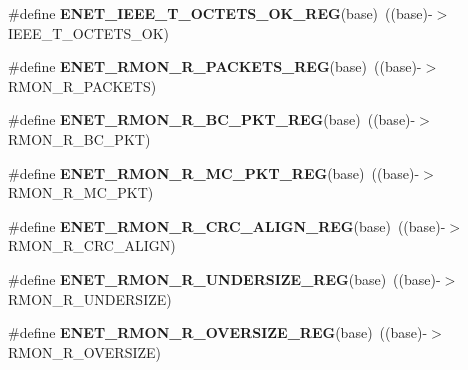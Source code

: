 \begin{DoxyCompactItemize}
\item 
\#define {\bfseries E\+N\+E\+T\+\_\+\+I\+E\+E\+E\+\_\+\+T\+\_\+\+O\+C\+T\+E\+T\+S\+\_\+\+O\+K\+\_\+\+R\+EG}(base)~((base)-\/$>$I\+E\+E\+E\+\_\+\+T\+\_\+\+O\+C\+T\+E\+T\+S\+\_\+\+OK)\hypertarget{group__ENET__Register__Accessor__Macros_gac9dce54cc0acf5325e797a79010ed817}{}\label{group__ENET__Register__Accessor__Macros_gac9dce54cc0acf5325e797a79010ed817}

\item 
\#define {\bfseries E\+N\+E\+T\+\_\+\+R\+M\+O\+N\+\_\+\+R\+\_\+\+P\+A\+C\+K\+E\+T\+S\+\_\+\+R\+EG}(base)~((base)-\/$>$R\+M\+O\+N\+\_\+\+R\+\_\+\+P\+A\+C\+K\+E\+TS)\hypertarget{group__ENET__Register__Accessor__Macros_gafb7aa4f09bcc45af7b97bec98b21447a}{}\label{group__ENET__Register__Accessor__Macros_gafb7aa4f09bcc45af7b97bec98b21447a}

\item 
\#define {\bfseries E\+N\+E\+T\+\_\+\+R\+M\+O\+N\+\_\+\+R\+\_\+\+B\+C\+\_\+\+P\+K\+T\+\_\+\+R\+EG}(base)~((base)-\/$>$R\+M\+O\+N\+\_\+\+R\+\_\+\+B\+C\+\_\+\+P\+KT)\hypertarget{group__ENET__Register__Accessor__Macros_ga65aa79116574a6b68541a91c1ef63a48}{}\label{group__ENET__Register__Accessor__Macros_ga65aa79116574a6b68541a91c1ef63a48}

\item 
\#define {\bfseries E\+N\+E\+T\+\_\+\+R\+M\+O\+N\+\_\+\+R\+\_\+\+M\+C\+\_\+\+P\+K\+T\+\_\+\+R\+EG}(base)~((base)-\/$>$R\+M\+O\+N\+\_\+\+R\+\_\+\+M\+C\+\_\+\+P\+KT)\hypertarget{group__ENET__Register__Accessor__Macros_gaeb2c69f6896d3204fda3ca59f230d49d}{}\label{group__ENET__Register__Accessor__Macros_gaeb2c69f6896d3204fda3ca59f230d49d}

\item 
\#define {\bfseries E\+N\+E\+T\+\_\+\+R\+M\+O\+N\+\_\+\+R\+\_\+\+C\+R\+C\+\_\+\+A\+L\+I\+G\+N\+\_\+\+R\+EG}(base)~((base)-\/$>$R\+M\+O\+N\+\_\+\+R\+\_\+\+C\+R\+C\+\_\+\+A\+L\+I\+GN)\hypertarget{group__ENET__Register__Accessor__Macros_ga70617df03d4a601b240cabb121635277}{}\label{group__ENET__Register__Accessor__Macros_ga70617df03d4a601b240cabb121635277}

\item 
\#define {\bfseries E\+N\+E\+T\+\_\+\+R\+M\+O\+N\+\_\+\+R\+\_\+\+U\+N\+D\+E\+R\+S\+I\+Z\+E\+\_\+\+R\+EG}(base)~((base)-\/$>$R\+M\+O\+N\+\_\+\+R\+\_\+\+U\+N\+D\+E\+R\+S\+I\+ZE)\hypertarget{group__ENET__Register__Accessor__Macros_ga5669edb0410f746459112f2cb57b1a7e}{}\label{group__ENET__Register__Accessor__Macros_ga5669edb0410f746459112f2cb57b1a7e}

\item 
\#define {\bfseries E\+N\+E\+T\+\_\+\+R\+M\+O\+N\+\_\+\+R\+\_\+\+O\+V\+E\+R\+S\+I\+Z\+E\+\_\+\+R\+EG}(base)~((base)-\/$>$R\+M\+O\+N\+\_\+\+R\+\_\+\+O\+V\+E\+R\+S\+I\+ZE)\hypertarget{group__ENET__Register__Accessor__Macros_gaa04a1630a859a56bc632bfab873cbf37}{}\label{group__ENET__Register__Accessor__Macros_gaa04a1630a859a56bc632bfab873cbf37}


\end{DoxyCompactItemize}
